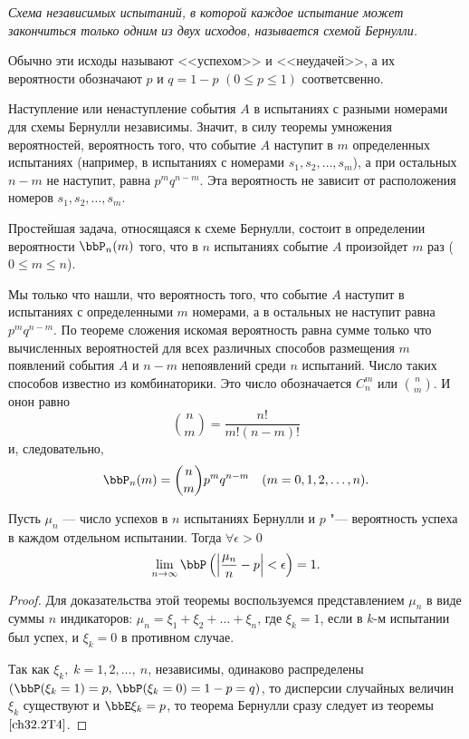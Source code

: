 \textit{Схема независимых испытаний, в которой каждое испытание может закончиться только одним из двух исходов, называется схемой Бернулли.}

Обычно эти исходы называют <<успехом>> и <<неудачей>>, а их вероятности обозначают $p$ и $q = 1 - p$ $(0 \le p \le 1)$ соответсвенно.

Наступление или ненаступление события $A$ в испытаниях с разными номерами для схемы Бернулли независимы. Значит, в силу теоремы умножения вероятностей, вероятность того, что событие $A$ наступит в $m$ определенных испытаниях (например, в испытаниях с номерами $s_1, s_2, \ldots, s_m$), а при остальных $n - m$ не наступит, равна $p^mq^{n - m}$. Эта вероятность не зависит от  расположения номеров $s_1, s_2, \ldots, s_m$.

Простейшая задача, относящаяся к схеме Бернулли, состоит в определении вероятности $\bbP_n(m)$ того, что в $n$ испытаниях событие $A$ произойдет $m$ раз ($0 \le m \le n$).

Мы только что нашли, что вероятность того, что событие $A$ наступит в испытаниях с определенными $m$ номерами, а в остальных не наступит равна $p^mq^{n - m}$. По теореме сложения искомая вероятность равна сумме только что вычисленных вероятностей для всех различных способов размещения $m$ появлений события $A$ и $n - m$ непоявлений среди $n$ испытаний. Число таких способов известно из комбинаторики. Это число обозначается  $C_n^m$ или $\binom n m $. И онон равно	
$$
\binom n m = \frac{n!}{m!(n - m)!}
$$
и, следовательно,
\begin{equation} \label{ch32.1.1eq1}
\bbP_n(m) = \binom n m p^mq^{n - m} \quad (m = 0,1,2,\ldots,n).
\end{equation}

\begin{thm} 
Пусть $\mu_n$ --- число успехов в $n$ испытаниях Бернулли и $p$ "--- вероятность успеха в каждом отдельном испытании. Тогда $\forall \epsilon > 0$
\begin{equation} \label{ch32.2eq7}
\lim_{n \to \infty} \bbP \left( \left| \frac{\mu_n}{n} - p \right| < \epsilon \right) = 1.
\end{equation}
\end{thm}

\begin{proof}
Для доказательства этой теоремы воспользуемся представлением $\mu_n$ в виде суммы $n$ индикаторов: $\mu_n = \xi_1 + \xi_2 + \ldots + \xi_n$, где $\xi_k = 1$, если в $k$-м испытании был успех, и $\xi_k  = 0$ в противном случае.

Так как $\xi_k,\; k = 1,2,\ldots, \: n$, независимы, одинаково распределены $(\bbP( \xi_k = 1) = p, \,\bbP( \xi_k = 0) = 1 - p = q)$, то дисперсии случайных величин $\xi_k$ существуют и $\bbE  \xi_k = p$, то теорема Бернулли сразу следует из теоремы $\ref{ch32.2T4}$.
\end{proof}

